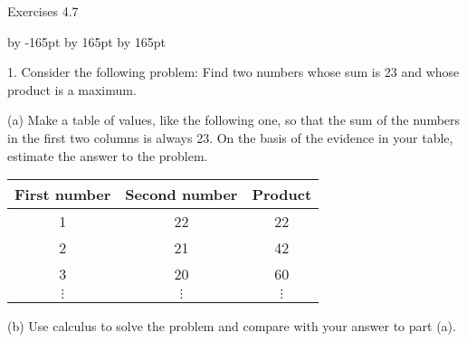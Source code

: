 \documentclass{sebase}
\begin{document}
Exercises 4.7

\vspace*{-9pt}%
\setlength{\columnsep}{24pt}
\advance \leftskip by -165pt
\advance\hsize by 165pt
\advance\linewidth by 165pt
\begin{multicols}{2}%

\begin{ExerciseList}
\item[\hfill 1.] Consider the following problem: Find two numbers whose sum
is 23 and whose product is a maximum.

\begin{ExerciseList}
\item[(a)] Make a table of values, like the following one, so that the sum
of the numbers in the first two columns is always 23. On the basis of the
evidence in your table, estimate the answer to the problem.\vspace{6pt}

\begin{tabular}{|l|l|l|}
\hline
First number & Second number & Product \\ \hline
\multicolumn{1}{|c|}{1} & \multicolumn{1}{|c|}{22} & \multicolumn{1}{|c|}{22}
\\ 
\multicolumn{1}{|c|}{2} & \multicolumn{1}{|c|}{21} & \multicolumn{1}{|c|}{42}
\\ 
\multicolumn{1}{|c|}{3} & \multicolumn{1}{|c|}{20} & \multicolumn{1}{|c|}{60}
\\ 
\multicolumn{1}{|c|}{$\vdots $} & \multicolumn{1}{|c|}{$\vdots $} & 
\multicolumn{1}{|c|}{$\vdots $} \\ \hline
\end{tabular}

%

%
\vspace{6pt}

\item[(b)] Use calculus to solve the problem and compare with your answer to
part (a).


\end{ExerciseList}
\end{ExerciseList}
\end{multicols}
\end{document}
